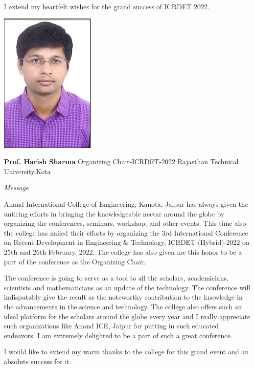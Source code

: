 \documentclass[twoside,11pt]{amsart}
\begin{document}
I extend my heartfelt wishes for the grand success of ICRDET 2022.
\vskip 1mm
\newpage
\vskip 5mm
\begin{flushright}
\includegraphics[height=8\baselineskip]{HS}
\end{flushright}
\vskip 1mm
\hfill \textbf{ Prof. Harish Sharma}
\vskip 1mm
\hfill Organizing Chair-ICRDET-2022
\vskip 1mm
\hfill Rajasthan Technical University,Kota
\vskip 10mm
\centerline {\huge{\emph{Message}}}
\vskip 10mm
Anand International College of Engineering, Kanota, Jaipur has always given the untiring efforts in bringing the knowledgeable nectar around the globe by organizing the conferences, seminars, workshop, and other events. This time also the college has nailed their efforts by organizing the 3rd International Conference on Recent Development in Engineering \& Technology, ICRDET (Hybrid)-2022 on 25th and 26th February, 2022. The college has also given me this honor to be a part of the conference as the Organizing Chair.

The conference is going to serve as a tool to all the scholars, academicians, scientists and mathematicians as an update of the technology. The conference will indisputably give the result as the noteworthy contribution to the knowledge in the advancements in the science and technology. The college also offers such an ideal platform for the scholars around the globe every year and I really appreciate such organizations like Anand ICE, Jaipur for putting in such educated endeavors. I am extremely delighted to be a part of such a great conference.

I would like to extend my warm thanks to the college for this grand event and an absolute success for it.

\vskip 1mm
\end{document}
